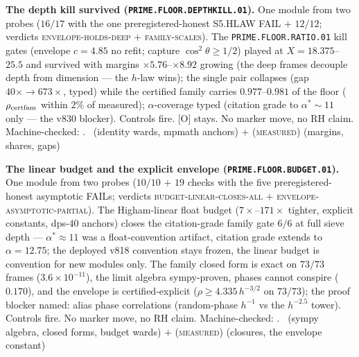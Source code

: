 \documentclass[11pt,a4paper]{article}
\theoremstyle{definition}
\begin{document}
\par\smallskip\noindent\textbf{The depth kill survived
(\texttt{PRIME.FLOOR.DEPTHKILL.01}).}
One module from two probes ($16/17$ with the one
preregistered-honest S5.HLAW FAIL $+$ $12/12$; verdicts
\textsc{envelope-holds-deep} $+$ \textsc{family-scales}).  The
\texttt{PRIME.FLOOR.RATIO.01} kill gates (envelope $c = 4.85$ no
refit; capture $\cos^2\theta \ge 1/2$) played at
$X = 18.375$--$25.5$ and survived with margins
$\times5.76$--$\times8.92$ growing (the deep frames decouple
depth from dimension --- the $h$-law wins); the single pair
collapses (gap $40\times \to 673\times$, typed) while the
certified family carries $0.977$--$0.981$ of the floor
($\rho_{\rm certfam}$ within $2\%$ of measured);
$\alpha$-coverage typed (citation grade to $\alpha^* \sim 11$
only --- the v830 blocker).  Controls fire.  [O] stays.  No
marker move, no RH claim.
Machine-checked: .
\mE\ (identity wards, mpmath anchors) $+$ (\textsc{measured})
(margins, shares, gaps)
\par\smallskip

\par\smallskip\noindent\textbf{The linear budget and the explicit
envelope (\texttt{PRIME.FLOOR.BUDGET.01}).}
One module from two probes ($10/10$ $+$ $19$ checks with the five
preregistered-honest asymptotic FAILs; verdicts
\textsc{budget-linear-closes-all} $+$
\textsc{envelope-asymptotic-partial}).  The Higham-linear float
budget ($7\times$--$171\times$ tighter, explicit constants,
dps-40 anchors) closes the citation-grade family gate $6/6$ at
full sieve depth --- $\alpha^* \approx 11$ was a float-convention
artifact, citation grade extends to $\alpha = 12.75$; the
deployed v818 convention stays frozen, the linear budget is
convention for new modules only.  The family closed form is
exact on $73/73$ frames ($3.6\times10^{-11}$), the limit algebra
sympy-proven, phases cannot conspire ($0.170$), and the envelope
is certified-explicit ($\rho \ge 4.335\,h^{-3/2}$ on $73/73$);
the proof blocker named: alias phase correlations (random-phase
$h^{-1}$ vs the $h^{-2.5}$ tower).  Controls fire.  No marker
move, no RH claim.
Machine-checked: .
\mE\ (sympy algebra, closed forms, budget wards) $+$
(\textsc{measured}) (closures, the envelope constant)
\par\smallskip
\end{document}
